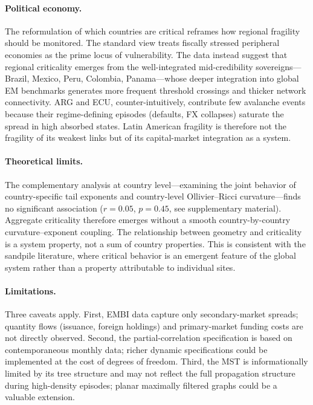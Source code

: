 \documentclass[12pt,a4paper]{article}
\begin{document}
\paragraph{Political economy.}
The reformulation of which countries are critical reframes how regional
fragility should be monitored. The standard view treats fiscally stressed
peripheral economies as the prime locus of vulnerability. The data instead
suggest that regional criticality emerges from the well-integrated
mid-credibility sovereigns---Brazil, Mexico, Peru, Colombia, Panama---whose
deeper integration into global EM benchmarks generates more frequent
threshold crossings and thicker network connectivity. ARG and ECU,
counter-intuitively, contribute few avalanche events because their
regime-defining episodes (defaults, FX collapses) saturate the spread in
high absorbed states. Latin American fragility is therefore not the
fragility of its weakest links but of its capital-market integration as a
system.

\paragraph{Theoretical limits.}
The complementary analysis at country level---examining the joint behavior
of country-specific tail exponents and country-level Ollivier--Ricci
curvature---finds no significant association ($r=0.05$, $p=0.45$, see
supplementary material). Aggregate criticality therefore emerges without a
smooth country-by-country curvature--exponent coupling. The relationship
between geometry and criticality is a system property, not a sum of
country properties. This is consistent with the sandpile literature, where
critical behavior is an emergent feature of the global system rather than
a property attributable to individual sites.

\paragraph{Limitations.}
Three caveats apply. First, EMBI data capture only secondary-market spreads;
quantity flows (issuance, foreign holdings) and primary-market funding
costs are not directly observed. Second, the partial-correlation
specification is based on contemporaneous monthly data; richer dynamic
specifications could be implemented at the cost of degrees of freedom.
Third, the MST is informationally limited by its tree structure and may
not reflect the full propagation structure during high-density episodes;
planar maximally filtered graphs \citep{Tumminello2005} could be a
valuable extension.
\end{document}
